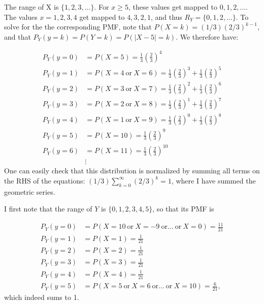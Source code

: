 \begin{problem}{15} The range of X is $\{1, 2, 3, \ldots \}$.  For $x\ge 5$, these values get mapped to $0, 1, 2, \ldots$.  The values $x=1, 2, 3, 4$ get mapped to $4, 3, 2, 1$, and thus $R_Y=\{0, 1, 2, \ldots\}$.  To solve for the the corresponding PMF, note that $P(X=k) = (1/3)(2/3)^{k-1}$, and that $P_Y(y=k)=P(Y=k)=P(|X-5|=k)$.  We therefore have:


  \begin{align*}
                                   P_Y(y=0) &= P(X=5) = \frac{1}{3}\left( \frac{2}{3}\right)^{4} \\
                                   P_Y(y=1) &= P(X=4~ \mathrm{or}~ X=6) =   \frac{1}{3} \left(\frac{2}{3}\right)^{3}+ \frac{1}{3}\left( \frac{2}{3}\right)^{5} \\
                                  P_Y(y=2) &= P(X=3~ \mathrm{or}~ X=7) =   \frac{1}{3} \left(\frac{2}{3}\right)^{2}+ \frac{1}{3}\left( \frac{2}{3}\right)^{6} \\
                                   P_Y(y=3) &=P(X=2~ \mathrm{or}~ X=8) =  \frac{1}{3}\left(\frac{2}{3}\right)^{1}+ \frac{1}{3} \left(\frac{2}{3}\right)^{7}   \\
                                   P_Y(y=4) &=P(X=1~ \mathrm{or}~ X=9) =   \frac{1}{3}\left( \frac{2}{3}\right)^{0}+ \frac{1}{3}\left( \frac{2}{3}\right)^{8} \\ 
                                   P_Y(y=5) &= P(X=10) =  \frac{1}{3}\left( \frac{2}{3}\right)^{9} \\
                                   P_Y(y=6) &= P(X=11) =  \frac{1}{3} \left(\frac{2}{3}\right)^{10} \\
                                  & \vdots 
  \end{align*}
One can easily check that this distribution is normalized by summing all terms on the RHS of the equations: $(1/3)\sum_{k=0}^{\infty}(2/3)^k =1$, where I have summed the geometric series.

\end{problem}

\begin{problem}{16} I first note that the range of $Y$ is $\{0, 1, 2, 3, 4, 5\}$, so that its PMF is

  \begin{align*}
                                   P_Y(y=0) &= P(X=10~ \mathrm{or}~ X=-9~ \mathrm{or} \ldots ~ \mathrm{or}~ X=0) = \frac{11}{21} \\
                                   P_Y(y=1) &=P(X=1)  =  \frac{1}{21} \\
                                  P_Y(y=2) &= P(X=2) =   \frac{1}{21} \\
                                   P_Y(y=3) &=P(X=3) = \frac{1}{21}   \\
                                   P_Y(y=4) &=P(X=4) =   \frac{1}{21} \\ 
                                   P_Y(y=5) &= P(X=5~ \mathrm{or}~ X=6~ \mathrm{or} \ldots ~ \mathrm{or}~ X=10) =  \frac{6}{21},
  \end{align*}
which indeed sums to 1.

\end{problem}

